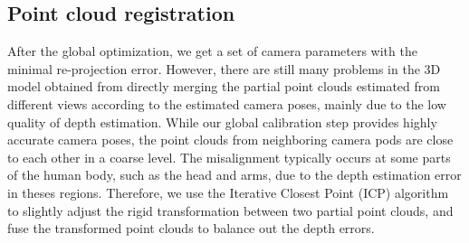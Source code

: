 
\subsection{Point cloud registration}
\label{sec:registration}


After the global optimization, we get a set of camera parameters with the minimal re-projection error.
However, there are still many problems in the 3D model obtained from directly merging the partial point clouds estimated from different views according to the estimated camera poses, mainly due to the low quality of depth estimation.
%
%
While our global calibration step provides highly accurate camera poses, the point clouds from neighboring camera pods are close to each other in a coarse level.
The misalignment typically occurs at some parts of the human body, such as the head and arms, due to the depth estimation error in theses regions.
%
Therefore, we use the Iterative Closest Point (ICP) algorithm~\cite{Besl1992A} to slightly adjust the rigid transformation between two partial point clouds, and fuse the transformed point clouds to balance out the depth errors.
%


